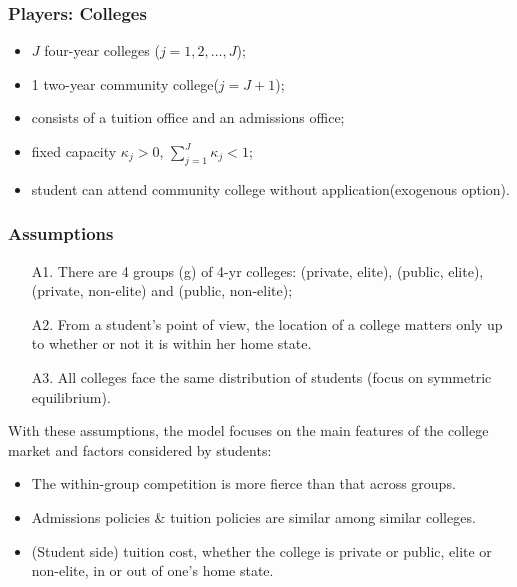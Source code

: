 \documentclass[10pt]{beamer}
\begin{document}
\begin{frame}[c]\frametitle{Players: Colleges}
\begin{itemize}
    \item $J$ four-year colleges ($j = 1,2,\ldots,J$);
    \item 1 two-year community college($j=J+1$);
    \item consists of a tuition office and an admissions office;
    \item fixed capacity $\kappa_{j}>0$, $\sum\limits_{j=1}^{J} \kappa_{j}<1$;
    \item  student can attend community college without application(exogenous
option).
\end{itemize}

\end{frame}

\begin{frame}[c]\frametitle{Assumptions}
\begin{enumerate}
\small
\item[A1.] There are 4 groups (g) of 4-yr colleges: (private, elite), (public, elite), (private, non-elite) and (public, non-elite);
\item[A2.] From a student's point of view, the location of a college matters only up to whether or not it is within her home state.
\item[A3.] All colleges face the same distribution of students (focus on \alert{symmetric equilibrium}).
\end{enumerate}
With these assumptions, the model focuses on the main features of the college market and  factors considered by students:
\begin{itemize}
\small
    \item  The within-group competition is more fierce than that across groups.
    \item  Admissions policies \& tuition policies are similar among similar colleges.
    \item  (Student side) tuition cost, whether the college is private or public, elite or non-elite, in or out of one's home state.
\end{itemize}

\end{frame}
\end{document}

